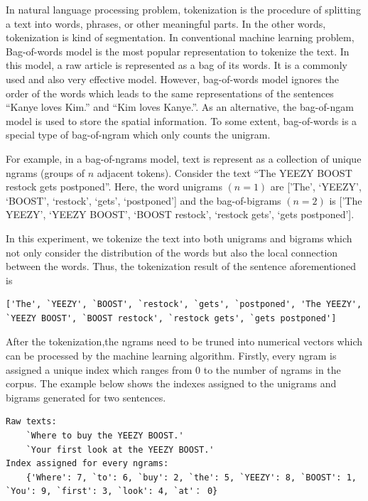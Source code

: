 In natural language processing problem, tokenization is the procedure of splitting a text into words, phrases, or other meaningful parts. In the other words, tokenization is kind of segmentation. In conventional machine learning problem, Bag-of-words model is the most popular representation to tokenize the text. In this model, a raw article is represented as a bag of its words. It is a commonly used and also very effective model. However, bag-of-words model ignores the order of the words which leads to the same representations of the sentences ``Kanye loves Kim.'' and ``Kim loves Kanye.''. As an alternative, the bag-of-ngam model is used to store the spatial information. To some extent, bag-of-words is a special type of bag-of-ngram which only counts the unigram. 

For example, in a bag-of-ngrams model, text is represent as a collection of unique ngrams (groups of $n$ adjacent tokens). Consider the text ``The YEEZY BOOST restock gets postponed''. Here, the word unigrams $(n=1)$ are ['The', `YEEZY', `BOOST', `restock', `gets', `postponed'] and the bag-of-bigrams $(n=2)$ is ['The YEEZY', `YEEZY BOOST', `BOOST restock', `restock gets', `gets postponed']. 

In this experiment, we tokenize the text into both unigrams and bigrams which not only consider the distribution of the words but also the local connection between the words. Thus, the tokenization result of the sentence aforementioned is 
\begin{lstlisting}[language=Tex,basicstyle = \ttfamily, breaklines = true]
['The', `YEEZY', `BOOST', `restock', `gets', `postponed', 'The YEEZY', `YEEZY BOOST', `BOOST restock', `restock gets', `gets postponed']
\end{lstlisting}

After the tokenization,the ngrams need to be truned into numerical vectors which can be processed by the machine learning algorithm. Firstly, every ngram is assigned a unique index which ranges from 0 to the number of ngrams in the corpus. The example below shows the indexes assigned to the unigrams and bigrams generated for two sentences.

\begin{lstlisting}[language=Tex,basicstyle = \ttfamily, breaklines = true]
Raw texts: 
	`Where to buy the YEEZY BOOST.'
	`Your first look at the YEEZY BOOST.'
Index assigned for every ngrams: 
	{'Where': 7, `to': 6, `buy': 2, `the': 5, `YEEZY': 8, `BOOST': 1, `You': 9, `first': 3, `look': 4, `at'： 0}
\end{lstlisting}

